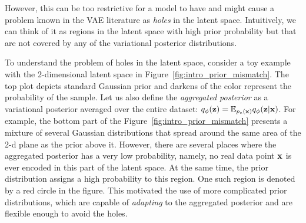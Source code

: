However, this can be too restrictive for a model to have and might cause a problem known in the VAE literature as \textit{holes} in the latent space. Intuitively, we can think of it as regions in the latent space with high prior probability but that are not covered by any of the variational posterior distributions. 

To understand the problem of holes in the latent space, consider a toy example with the 2-dimensional latent space in Figure~\ref{fig:intro_prior_mismatch}. The top plot depicts standard Gaussian prior and darkens of the color represent the probability of the sample. Let us also define the \textit{aggregated posterior} as a variational posterior averaged over the entire dataset: $q_{\phi}({\mathbf{z}}) = \mathbb{E}_{p_{e}({\mathbf{x}})}q_{\phi}({\mathbf{z}}|{\mathbf{x}})$. For example, the bottom part of the Figure~\ref{fig:intro_prior_mismatch} presents a mixture of several Gaussian distributions that spread around the same area of the 2-d plane as the prior above it. However, there are several places where the aggregated posterior has a very low probability, namely, no real data point ${\mathbf{x}}$ is ever encoded in this part of the latent space. At the same time, the prior distribution assigns a high probability to this region. One such region is denoted by a red circle in the figure. 
This motivated the use of more complicated prior distributions, which are capable of \textit{adapting} to the aggregated posterior and are flexible enough to avoid the holes. 

